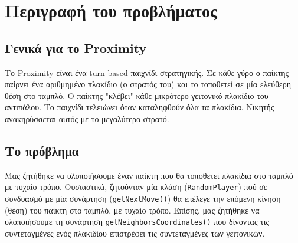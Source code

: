 \chapter{Περιγραφή του προβλήματος}

\section{Γενικά για το Proximity}
Το \href{http://www.newsandentertainment.com/zfproximity.html}{Proximity}
είναι ένα turn-based παιχνίδι στρατηγικής.
Σε κάθε γύρο ο παίκτης παίρνει ένα αριθμημένο πλακίδιο (ο στρατός του)
και το τοποθετεί σε μία ελεύθερη θέση στο ταμπλό.
Ο παίκτης "κλέβει" κάθε μικρότερο γειτονικό πλακίδιο του αντιπάλου.
Το παιχνίδι τελειώνει όταν καταληφθούν όλα τα πλακίδια.
Νικητής ανακηρύσσεται αυτός με το μεγαλύτερο στρατό.

\section{Το πρόβλημα}
Μας ζητήθηκε να υλοποιήσουμε έναν παίκτη που θα τοποθετεί πλακίδια στο
ταμπλό με τυχαίο τρόπο.
Ουσιαστικά, ζητούνταν μία κλάση (\lstinline!RandomPlayer!) πού σε
συνδυασμό με μία συνάρτηση (\lstinline!getNextMove()!) θα επέλεγε την επόμενη
κίνηση (θέση) του παίκτη στο ταμπλό, με τυχαίο τρόπο.
Επίσης, μας ζητήθηκε να
υλοποιήσουμε τη συνάρτηση \lstinline!getNeighborsCoordinates()! που δίνοντας τις
συντεταγμένες ενός πλακιδίου επιστρέφει τις συντεταγμένες των γειτονικών.
